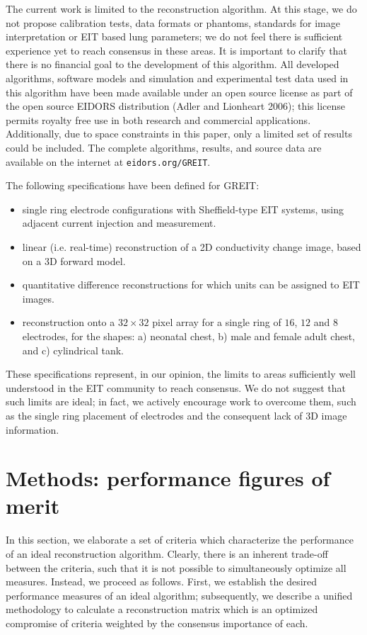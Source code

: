 \documentclass[12pt]{iopart}
\begin{document}
The current work is limited to the reconstruction algorithm.
At this stage, we do not propose calibration tests, data
 formats or phantoms, standards
for image interpretation or EIT based lung parameters; 
we do not feel there is sufficient experience yet to reach
consensus in these areas.
It is important to clarify that there is no financial
goal to the development of this algorithm.
All developed algorithms, software
models and simulation and experimental test data used
in this algorithm have been
made available under an open source license as part of
the open source EIDORS distribution (Adler and Lionheart 2006);
this license permits
royalty free use in both research and commercial applications.
Additionally, due to space constraints in this paper, only a
limited set of results could be included. The complete
algorithms, results, and source data are available on the 
internet at \verb+eidors.org/GREIT+.



The following specifications have been defined for GREIT:
\begin{itemize}
\item
 single ring electrode
configurations with Sheffield-type EIT systems, using
      adjacent current injection and measurement.
\item
 linear (i.e. real-time) reconstruction of a 2D conductivity
change image, based on a 3D forward model.
\item
 quantitative difference reconstructions for which units can
  be assigned to EIT images.
\item
 reconstruction onto 
      a $32\times 32$ pixel array
      for a single ring of $16$, $12$ and $8$ 
      electrodes, for the shapes:
   a) neonatal chest, 
   b) male and female adult chest, and
   c) cylindrical tank.
\end{itemize}

These specifications represent, in our opinion, the limits
to areas sufficiently well understood in the EIT community
to reach consensus. We do not suggest that such limits are ideal;
in fact, we actively encourage work to overcome them, 
such as the single ring placement of electrodes and the consequent
lack of 3D image information. 

\section{Methods: performance figures of merit}
\label{sec:figmerit}

In this section, we elaborate a set of criteria which 
characterize the performance of an ideal reconstruction
algorithm. Clearly, there is an inherent trade-off between
the criteria, such that it is not possible to 
simultaneously optimize all measures. Instead, we proceed
as follows. First, we establish the desired performance measures
of an ideal algorithm; subsequently, 
we describe a unified methodology to calculate a reconstruction
matrix which is an optimized compromise of criteria
weighted by the consensus importance of each.  
\end{document}
